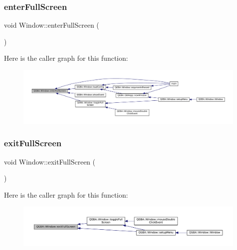 \subsubsection{\texorpdfstring{enter\+Full\+Screen}{enterFullScreen}}
{\footnotesize\ttfamily void Window\+::enter\+Full\+Screen (\begin{DoxyParamCaption}{ }\end{DoxyParamCaption})\hspace{0.3cm}{\ttfamily [slot]}}

Here is the caller graph for this function\+:
\nopagebreak
\begin{figure}[H]
\begin{center}
\leavevmode
\includegraphics[width=350pt]{class_q_g_b_a_1_1_window_a92ffce5aac01967b0faaa5eb0885726e_icgraph}
\end{center}
\end{figure}
\mbox{\label{class_q_g_b_a_1_1_window_a28d5345bc6bf0752ee64653885d08202}} 
\subsubsection{\texorpdfstring{exit\+Full\+Screen}{exitFullScreen}}
{\footnotesize\ttfamily void Window\+::exit\+Full\+Screen (\begin{DoxyParamCaption}{ }\end{DoxyParamCaption})\hspace{0.3cm}{\ttfamily [slot]}}

Here is the caller graph for this function\+:
\nopagebreak
\begin{figure}[H]
\begin{center}
\leavevmode
\includegraphics[width=350pt]{class_q_g_b_a_1_1_window_a28d5345bc6bf0752ee64653885d08202_icgraph}
\end{center}
\end{figure}
\mbox{\label{class_q_g_b_a_1_1_window_a22981b021419ff73e53ec7e1cbf661b9}} 
